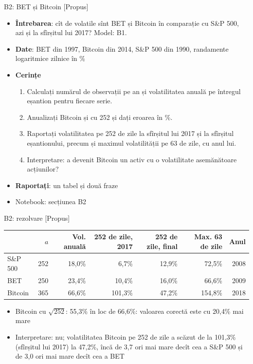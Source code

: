 \begin{frame}{B2: BET și Bitcoin [Propus]}
\itemsize{\footnotesize}
\begin{itemize}
\item \textbf{Întrebarea}: cît de volatile sînt BET și Bitcoin în comparație cu S\&P 500, azi și la sfîrșitul lui 2017? Model: B1.
\item \textbf{Date}: BET din 1997, Bitcoin din 2014, S\&P 500 din 1990, randamente logaritmice zilnice în \%
\item \textbf{Cerințe}
\begin{enumerate}
    \item Calculați numărul de observații pe an și volatilitatea anuală pe întregul eșantion pentru fiecare serie.
    \item Anualizați Bitcoin și cu 252 și dați eroarea în \%.
    \item Raportați volatilitatea pe 252 de zile la sfîrșitul lui 2017 și la sfîrșitul eșantionului, precum și maximul volatilității pe 63 de zile, cu anul lui.
    \item Interpretare: a devenit Bitcoin un activ cu o volatilitate asemănătoare acțiunilor?
\end{enumerate}
\item \textbf{Raportați}: un tabel și două fraze
\item Notebook: secțiunea B2
\end{itemize}
\end{frame}

\ifsolutions
\begin{frame}{B2: rezolvare [Propus]}
\itemsize{\footnotesize}
\begin{center}
\footnotesize
\begin{tabular}{lrrrrrr}
\toprule
& $a$ & \textbf{Vol. anuală} & \textbf{252 de zile, 2017} & \textbf{252 de zile, final} & \textbf{Max. 63 de zile} & \textbf{Anul} \\
\midrule
S\&P 500 & 252 & 18{,}0\% & 6{,}7\% & 12{,}9\% & 72{,}5\% & 2008 \\
BET & 250 & 23{,}4\% & 10{,}4\% & 16{,}0\% & 66{,}6\% & 2009 \\
Bitcoin & 365 & 66{,}6\% & 101{,}3\% & 47{,}2\% & 154{,}8\% & 2018 \\
\bottomrule
\end{tabular}
\end{center}
\begin{itemize}
    \item Bitcoin cu $\sqrt{252}$: 55{,}3\% în loc de 66{,}6\%: valoarea corectă este cu 20{,}4\% mai mare
    \item Interpretare: nu; volatilitatea Bitcoin pe 252 de zile a scăzut de la 101{,}3\% (sfîrșitul lui 2017) la 47{,}2\%, încă de 3{,}7 ori mai mare decît cea a S\&P 500 și de 3{,}0 ori mai mare decît cea a BET
\end{itemize}
\end{frame}
\fi

